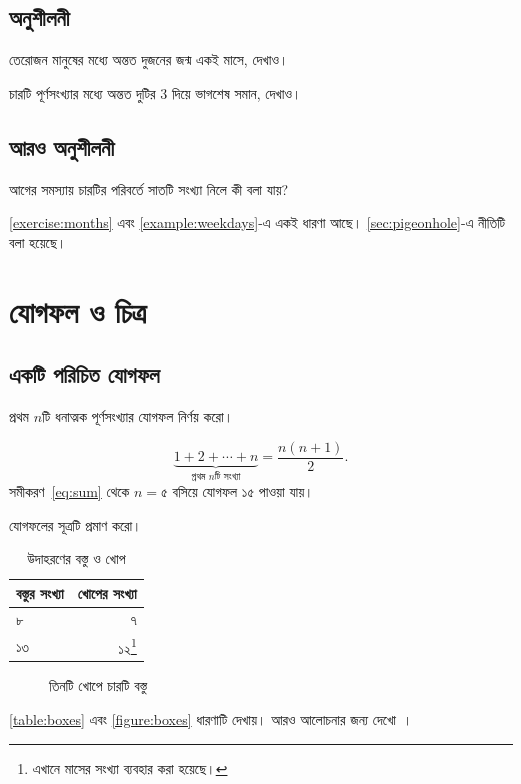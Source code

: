 \documentclass[12pt,twoside]{bookbangla}
\begin{document}
\section{অনুশীলনী}
\begin{exercise}[hint={বছরের মাসগুলোকে খোপ ধরো; $13>12$।}]
\label{exercise:months}
তেরোজন মানুষের মধ্যে অন্তত দুজনের জন্ম একই মাসে, দেখাও।
\end{exercise}
\begin{exercise}\label{exercise:remainders}
চারটি পূর্ণসংখ্যার মধ্যে অন্তত দুটির $3$ দিয়ে ভাগশেষ সমান, দেখাও।
\end{exercise}
\section{আরও অনুশীলনী}
\begin{exercise}\label{exercise:continued}
আগের সমস্যায় চারটির পরিবর্তে সাতটি সংখ্যা নিলে কী বলা যায়?
\end{exercise}
\autoref{exercise:months} এবং \autoref{example:weekdays}-এ একই ধারণা আছে।
\autoref{sec:pigeonhole}-এ নীতিটি বলা হয়েছে।

\chapter{যোগফল ও চিত্র}
\section{একটি পরিচিত যোগফল}
\begin{example}\label{example:sum}
প্রথম $n$টি ধনাত্মক পূর্ণসংখ্যার যোগফল নির্ণয় করো।
\end{example}
\begin{equation}\label{eq:sum}
  \underbrace{1+2+\cdots+n}_{\text{প্রথম }n\text{টি সংখ্যা}}
  = \frac{n(n+1)}{2}.
\end{equation}
সমীকরণ~\eqref{eq:sum} থেকে $n=৫$ বসিয়ে যোগফল $১৫$ পাওয়া যায়।
\begin{exercise}[hint={দুটি সমান যোগফল বিপরীত ক্রমে সাজাও।}]
\label{exercise:newchapter}
যোগফলের সূত্রটি প্রমাণ করো।
\end{exercise}

\begin{table}[htbp]
\centering
\begin{tabular}{lr}
\toprule
বস্তুর সংখ্যা & খোপের সংখ্যা\\
\midrule
৮ & ৭\\
১৩ & ১২\footnote{এখানে মাসের সংখ্যা ব্যবহার করা হয়েছে।}\\
\bottomrule
\end{tabular}
\caption{উদাহরণের বস্তু ও খোপ}\label{table:boxes}
\end{table}
\begin{figure}[htbp]
\centering
{}
\caption{তিনটি খোপে চারটি বস্তু}\label{figure:boxes}
\end{figure}
\autoref{table:boxes} এবং \autoref{figure:boxes} ধারণাটি দেখায়।
আরও আলোচনার জন্য দেখো~\cite{graham}।
\end{document}
